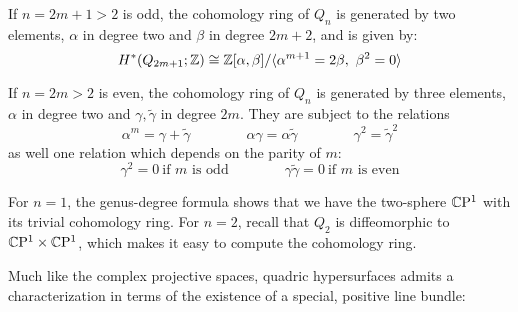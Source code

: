 \begin{thm}\leavevmode
	\begin{numberedlist}
		\item If $n=2m+1>2$ is odd, the cohomology ring of $Q_n$ is generated by two elements, $\alpha$ in degree two and $\beta$ in degree $2m+2$, and is given by:
		\begin{equation*}
			H^*(Q_{2m+1};\Z)\cong \Z[\alpha,\beta]/\langle \alpha^{m+1}=2\beta,\ \beta^2=0\rangle
		\end{equation*}
		\item If $n=2m>2$ is even, the cohomology ring of $Q_n$ is generated by three elements, $\alpha$ in degree two and $\gamma,\tilde\gamma$ in degree $2m$. They are subject to the relations
		\begin{equation*}
			\alpha^m=\gamma+\tilde\gamma \qquad \qquad \alpha\gamma=\alpha\tilde\gamma \qquad \qquad
			\gamma^2=\tilde\gamma^2
		\end{equation*}
		as well one relation which depends on the parity of $m$:
		\begin{equation*}
			\gamma^2=0\ \text{if $m$ is odd} \qquad \qquad 
			\gamma\tilde\gamma=0 \ \text{if $m$ is even}
		\end{equation*}
	\end{numberedlist}
\end{thm}

\begin{rem}
	For $n=1$, the genus-degree formula shows that we have the two-sphere $\mathbb{C}\mathrm{P}^1$ with its trivial cohomology ring. For $n=2$, recall that $Q_2$ is diffeomorphic to $\mathbb{C}\mathrm{P}^1\times\mathbb{C}\mathrm{P}^1$, which makes it easy to compute the cohomology ring.
\end{rem}

Much like the complex projective spaces, quadric hypersurfaces admits a characterization in terms of the existence of a special, positive line bundle:

